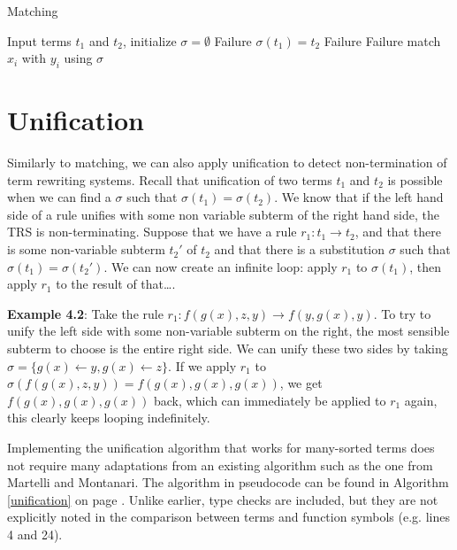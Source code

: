 \begin{algorithm}
\caption{Matching}
\label{matching}
\begin{algorithmic}[5]
\STATE Input terms $t_1$ and $t_2$, initialize $\sigma = \emptyset$
      \RETURN Failure
    \ENDIF
  \ELSE
    \STATE $\sigma(t_1) = t_2$
  \ENDIF
{}
    \RETURN Failure
      \RETURN Failure
    \ENDIF
      \STATE match $x_i$ with $y_i$ using $\sigma$
    \ENDFOR
  \ENDIF
\ENDIF
\end{algorithmic}
\end{algorithm}

\section{Unification}
Similarly to matching, we can also apply unification to detect non-termination of term rewriting systems. Recall that unification of two terms $t_1$ and $t_2$ is possible when we can find a $\sigma$ such that $\sigma(t_1) = \sigma(t_2)$. We know that if the left hand side of a rule unifies with some non variable subterm of the right hand side, the TRS is non-terminating.\newline
Suppose that we have a rule $r_1: t_1 \rightarrow t_2$, and that there is some non-variable subterm $t_2'$ of $t_2$ and that there is a substitution $\sigma$ such that $\sigma(t_1) = \sigma(t_2')$. We can now create an infinite loop: apply $r_1$ to $\sigma(t_1)$, then apply $r_1$ to the result of that\dots.

\textbf{Example 4.2}: Take the rule $r_1: f(g(x), z, y) \rightarrow f(y, g(x), y)$. To try to unify the left side with some non-variable subterm on the right, the most sensible subterm to choose is the entire right side. We can unify these two sides by taking $\sigma = \{ g(x) \leftarrow y, g(x) \leftarrow z \}$. If we apply $r_1$ to $\sigma(f(g(x), z, y)) = f(g(x), g(x), g(x))$, we get $f(g(x), g(x), g(x))$ back, which can immediately be applied to $r_1$ again, this clearly keeps looping indefinitely.

Implementing the unification algorithm that works for many-sorted terms does not require many adaptations from an existing algorithm such as the one from Martelli and Montanari.\cite{Martelli:1982} The algorithm in pseudocode can be found in Algorithm \ref{unification} on page \pageref{unification}. Unlike earlier, type checks are included, but they are not explicitly noted in the comparison between terms and function symbols (e.g. lines 4 and 24).  

